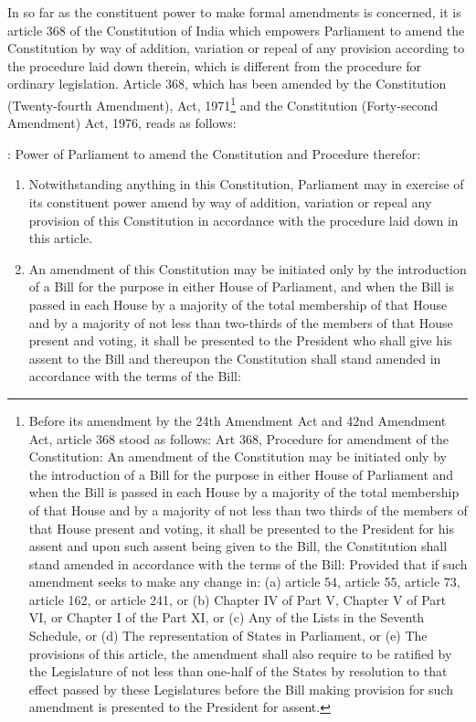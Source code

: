 \begin{multicols}{2}
\noi
In so far as the constituent power to make formal amendments is concerned, it is article 368
of the Constitution of India which empowers Parliament to amend the Constitution by way of
addition, variation or repeal of any provision according to the procedure laid down therein,
which is different from the procedure for ordinary legislation. Article 368, which has been
amended by the Constitution (Twenty-fourth Amendment), Act, 1971\footnote{Before its amendment by the 24th Amendment Act and 42nd Amendment Act, article 368 stood as follows: Art 368, Procedure for amendment of the Constitution: An amendment of the Constitution may be initiated only by the introduction of a Bill for the purpose in either House of Parliament and when the Bill is passed in each House by a majority of the total membership of that House and by a majority of not less than two thirds of the members of that House present and voting, it shall be presented to the President for his assent and upon such assent being
given to the Bill, the Constitution shall stand amended in accordance with the terms of the Bill: Provided that if
such amendment seeks to make any change in: (a) article 54, article 55, article 73, article 162, or article 241, or
(b) Chapter IV of Part V, Chapter V of Part VI, or Chapter I of the Part XI, or (c) Any of the Lists in the Seventh
Schedule, or (d) The representation of States in Parliament, or (e) The provisions of this article, the amendment shall also require to be ratified by the Legislature of not less than one-half of the States by resolution to that effect
passed by these Legislatures before the Bill making provision for such amendment is presented to the President
for assent.} and the Constitution (Forty-second Amendment) Act, 1976, reads as follows:

 : Power of Parliament to amend the Constitution and Procedure therefor:

\begin{enumerate}
\itemsep=0pt
\item Notwithstanding anything in this Constitution, Parliament may in exercise of its constituent
power amend by way of addition, variation or repeal any provision of this Constitution in
accordance with the procedure laid down in this article.

\item  An amendment of this Constitution may be initiated only by the introduction of a Bill for
the purpose in either House of Parliament, and when the Bill is passed in each House by a
majority of the total membership of that House and by a majority of not less than two-thirds
of the members of that House present and voting, it shall be presented to the President who
shall give his assent to the Bill and thereupon the Constitution shall stand amended in
accordance with the terms of the Bill:


\end{enumerate}
\end{multicols}
